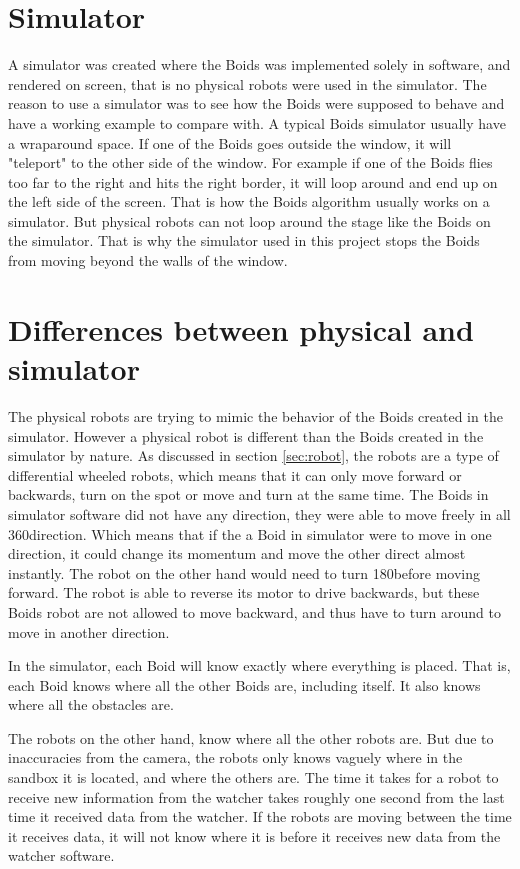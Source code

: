 \section{Simulator}
A simulator was created where the Boids was implemented solely in software, and rendered on screen, that is no physical robots were used in the simulator. The reason to use a simulator was to see how the Boids were supposed to behave and have a working example to compare with. A typical Boids simulator usually have a wraparound space. If one of the Boids goes outside the window, it will "teleport" to the other side of the window. For example if one of the Boids flies too far to the right and hits the right border, it will loop around and end up on the left side of the screen. That is how the Boids algorithm usually works on a simulator. But physical robots can not loop around the stage like the Boids on the simulator. That is why the simulator used in this project stops the Boids from moving beyond the walls of the window.



\section{Differences between physical and simulator}
The physical robots are trying to mimic the behavior of the Boids created in the simulator. However a physical robot is different than the Boids created in the simulator by nature. As discussed in section \ref{sec:robot}, the robots are a type of differential wheeled robots, which means that it can only move forward or backwards, turn on the spot or move and turn at the same time. The Boids in simulator software did not have any direction, they were able to move freely in all 360\textdegree direction. Which means that if the a Boid in simulator were to move in one direction, it could change its momentum and move the other direct almost instantly. The robot on the other hand would need to turn 180\textdegree before moving forward. The robot is able to reverse its motor to drive backwards, but these Boids robot are not allowed to move backward, and thus have to turn around to move in another direction.

In the simulator, each Boid will know exactly where everything is placed. That is, each Boid knows where all the other Boids are, including itself. It also knows where all the obstacles are.

The robots on the other hand, know where all the other robots are. But due to inaccuracies from the camera, the robots only knows vaguely where in the sandbox it is located, and where the others are. The time it takes for a robot to receive new information from the watcher takes roughly one second from the last time it received data from the watcher. If the robots are moving between the time it receives data, it will not know where it is before it receives new data from the watcher software.
